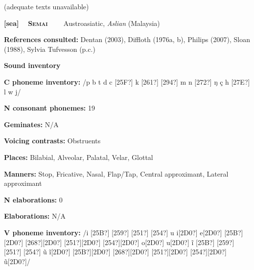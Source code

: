\begin{styleBody}
(adequate texts unavailable)
\end{styleBody}

\clearpage\begin{styleBody}
\textbf{[sea] }\ \ \textbf{\textsc{Semai\ \ }}\textbf{\ \ }Austroasiatic, \textit{Aslian} (Malaysia)
\end{styleBody}

\begin{styleBody}
\textbf{References consulted: }Dentan (2003), Diffloth (1976a, b), Philips (2007), Sloan (1988), Sylvia Tufvesson (p.c.)
\end{styleBody}

\begin{styleBody}
\textbf{Sound inventory}
\end{styleBody}

\begin{styleBody}
\textbf{C phoneme inventory:} /p b t d c [25F?] k [261?] [294?] m n [272?] ŋ ç h [27E?] l w j/
\end{styleBody}

\begin{styleBody}
\textbf{N consonant phonemes:} 19
\end{styleBody}

\begin{styleBody}
\textbf{Geminates:} N/A
\end{styleBody}

\begin{styleBody}
\textbf{Voicing contrasts:} Obstruents
\end{styleBody}

\begin{styleBody}
\textbf{Places:} Bilabial, Alveolar, Palatal, Velar, Glottal
\end{styleBody}

\begin{styleBody}
\textbf{Manners:} Stop, Fricative, Nasal, Flap/Tap, Central approximant, Lateral approximant
\end{styleBody}

\begin{styleBody}
\textbf{N elaborations:} 0
\end{styleBody}

\begin{styleBody}
\textbf{Elaborations:} N/A
\end{styleBody}

\begin{styleBody}
\textbf{V phoneme inventory:} /i [25B?] [259?] [251?] [254?] u i[2D0?] e[2D0?] [25B?][2D0?] [268?][2D0?] [251?][2D0?] [254?][2D0?] o[2D0?] u[2D0?] \~{i} [25B?] [259?] [251?] [254?] \~{u} \~{i}[2D0?] [25B?][2D0?] [268?][2D0?] [251?][2D0?] [254?][2D0?] \~{u}[2D0?]/
\end{styleBody}

